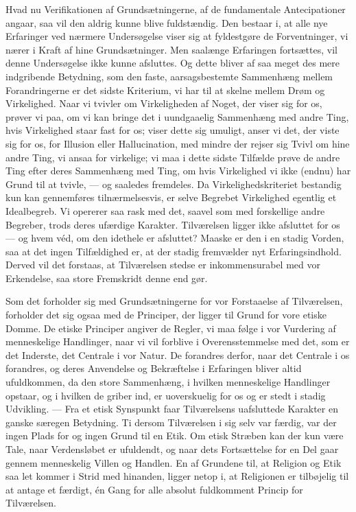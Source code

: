 \documentclass[12pt,a4paper,openany]{book}
\newcommand{\opage}[1]{\marginnote{\footnotesize\textit{[#1]}}}
\begin{document}
Hvad nu Verifikationen af Grundsætningerne, af de fundamentale
Antecipationer angaar, saa vil den aldrig kunne blive fuldstændig. Den
bestaar i, at alle nye Erfaringer ved nærmere Undersøgelse viser sig at
fyldestgøre de Forventninger, vi nærer i Kraft af hine Grundsætninger.
Men saalænge Erfaringen fortsættes, vil denne Undersøgelse ikke kunne
afsluttes. Og dette bliver af saa meget des mere indgribende Betydning,
som den faste, aarsagsbestemte Sammenhæng mellem Forandringerne er det
sidste Kriterium, vi har til at skelne mellem Drøm og Virkelighed. Naar
vi tvivler om Virkeligheden af Noget, der viser sig for os, prøver vi
paa, om vi kan bringe det i uundgaaelig Sammenhæng med andre Ting, hvis
Virkelighed staar fast for os; viser dette sig umuligt, anser vi det,
der viste sig for os, for Illusion eller Hallucination, med mindre der
rejser sig Tvivl om hine andre Ting, vi ansaa for virkelige; vi maa i
dette sidste Tilfælde prøve de andre Ting efter deres Sammenhæng med
Ting, om hvis Virkelighed vi ikke (endnu) har Grund til at tvivle, ---
og saaledes fremdeles. Da Virkelighedskriteriet bestandig kun kan
gennemføres tilnærmelsesvis, er selve Begrebet Virkelighed egentlig et
Idealbegreb. Vi opererer saa rask med det, saavel som med forskellige
andre Begreber, trods deres ufærdige Karakter. Tilværelsen ligger ikke
afsluttet for os --- og hvem véd, om den idethele er afsluttet? Maaske
er den i en stadig Vorden, saa at det ingen Tilfældighed er, at der
stadig fremvælder nyt Erfaringsindhold. Derved vil det forstaas, at
Tilværelsen stedse er inkommensurabel med vor Erkendelse, saa store
Fremskridt denne end gør.

\opage{168}Som det forholder sig med Grundsætningerne for vor
Forstaaelse af Tilværelsen, forholder det sig ogsaa med de Principer,
der ligger til Grund for vore etiske Domme. De etiske Principer angiver
de Regler, vi maa følge i vor Vurdering af menneskelige Handlinger, naar
vi vil forblive i Overensstemmelse med det, som er det Inderste, det
Centrale i vor Natur. De forandres derfor, naar det Centrale i os
forandres, og deres Anvendelse og Bekræftelse i Erfaringen bliver altid
ufuldkommen, da den store Sammenhæng, i hvilken menneskelige Handlinger
opstaar, og i hvilken de griber ind, er uoverskuelig for os og er stedt
i stadig Udvikling. --- Fra et etisk Synspunkt faar Tilværelsens
uafsluttede Karakter en ganske særegen Betydning. Ti dersom Tilværelsen
i sig selv var færdig, var der ingen Plads for og ingen Grund til en
Etik. Om etisk Stræben kan der kun være Tale, naar Verdensløbet er
ufuldendt, og naar dets Fortsættelse for en Del gaar gennem menneskelig
Villen og Handlen. En af Grundene til, at Religion og Etik saa let
kommer i Strid med hinanden, ligger netop i, at Religionen er tilbøjelig
til at antage et færdigt, én Gang for alle absolut fuldkomment Princip
for Tilværelsen.
\end{document}
